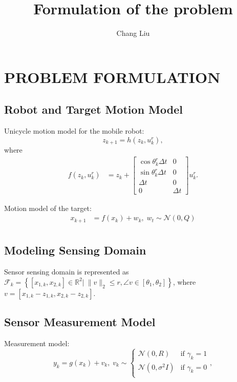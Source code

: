 \documentclass[letterpaper, 10 pt, conference]{ieeeconf}  %
\title{\LARGE \bf
Formulation of the problem}
\author{Chang Liu}%
\newcommand{\todopara}[1]{\vspace{0px} %
	\todo[inline, color=black!10]{\textbf{[Paragraph:]} {#1}} %
}
\newcommand{\todonote}[1]{\vspace{0px} %
	\todo[inline, color=green!30]{\textbf{[Note:]} {#1}} %
}
\newcommand{\todoQ}[1]{\vspace{0px} %
	\todo[inline, color=orange!50]{\textbf{[Note:]} {#1}} %
}
\newcommand{\todohere}[1]{\hl{(\textbf{TODO:} #1)}}
\newcommand{\hidetodos}{
	\renewcommand{\todopara}[1]{}
	\renewcommand{\todonote}[1]{}
	\renewcommand{\todoQ}[1]{}
	\renewcommand{\todohere}[1]{}
	}
\begin{document}

\maketitle
\thispagestyle{empty}
\pagestyle{empty}

\section{PROBLEM FORMULATION}\label{sec:prob_form}

\subsection{Robot and Target Motion Model}
Unicycle motion model for the mobile robot:
\begin{equation}\label{eqn:target_motion_model}
z_{k+1}=h(z_k,u^r_k),
\end{equation}
where
	\begin{align}
		f(z_k,u^r_k)&=z_{k}+
		\begin{bmatrix}
			\cos{\theta^r_{k}}\Delta t & 0\\
			\sin{\theta^r_{k}}\Delta t & 0\\
			\Delta t & 0\\
			0 & \Delta t
		\end{bmatrix}u^r_{k}\nonumber.
	\end{align}

Motion model of the target:
\begin{align}
x_{k+1}&=f(x_k)+w_k,\;w_t\sim \mathcal{N}(0,Q)\\
\end{align}

\subsection{Modeling Sensing Domain}
Sensor sensing domain is represented as $\mathcal{F}_k=\left\lbrace [x_{1,k},x_{2,k}]\in\mathbb{R}^2|\:\|v\|_2\leq r, \angle v\in[\theta_1,\theta_2]\right\rbrace$, where $v=[x_{1,k}-z_{1,k},x_{2,k}-z_{2,k}]$.

\subsection{Sensor Measurement Model}
Measurement model:
\begin{equation}\label{eqn:sensor}
y_{k}=g(x_k)+v_k,\;v_k\sim
\begin{cases}
\mathcal{N}(0,R) & \text{if } \gamma_k=1\\%
\mathcal{N}(0,\sigma^2 I) & \text{if } \gamma_k=0\\%
\end{cases},
\end{equation}
\end{document}
